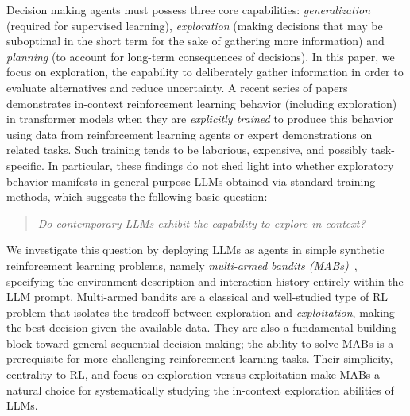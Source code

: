 Decision making agents must possess three core capabilities: \emph{generalization} (required for supervised learning), \emph{exploration} (making decisions that may be suboptimal in the short term for the sake of gathering more information) and \emph{planning} (to account for long-term consequences of decisions).
In this paper, we focus on exploration, the capability to deliberately gather information in order to evaluate alternatives and reduce uncertainty.
A recent series of papers~\citep{laskin2022context,lee2023supervised,raparthy2023generalization} demonstrates in-context reinforcement learning behavior (including exploration) in transformer models when they are \emph{explicitly trained} to produce this behavior using data from reinforcement learning agents or expert demonstrations on related tasks.
Such training tends to be laborious, expensive, and possibly task-specific.
In particular, these findings do not shed light into whether exploratory behavior manifests in general-purpose LLMs obtained via standard training methods, which suggests the following basic question:

\begin{quote}
\begin{center}
  \emph{Do contemporary LLMs exhibit the capability to explore in-context?}
\end{center}
\end{quote}


We investigate this question by deploying
LLMs as agents in simple synthetic reinforcement learning problems, namely \emph{multi-armed bandits (MABs)}~\citep{slivkins-MABbook,LS19bandit-book}, specifying the environment description and interaction history entirely within the LLM prompt.
Multi-armed bandits are a classical and well-studied type of RL problem that isolates the tradeoff between exploration and \emph{exploitation}, \ie making the best decision given the available data.
They are also a fundamental building block toward general sequential decision making; the ability to solve MABs is a prerequisite for more challenging reinforcement learning tasks.
Their simplicity, centrality to RL, and focus on exploration versus exploitation make MABs a natural choice for systematically studying the in-context exploration abilities of LLMs.

